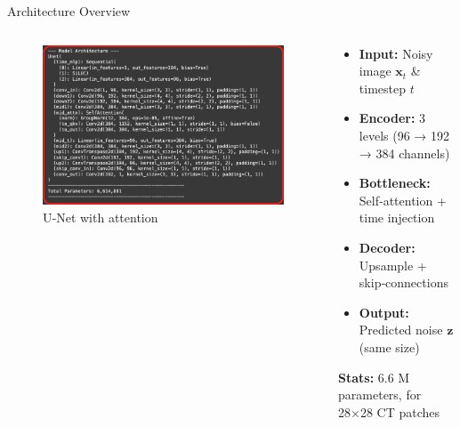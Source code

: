 \documentclass[10pt]{beamer}
\begin{document}
\begin{frame}{Architecture Overview}
  \begin{columns}[T]
    \begin{column}{0.55\textwidth}
        \begin{figure}
            \centering
            \includegraphics[width=\linewidth]{big_model_arch.png}
            \caption{U‑Net with attention}

        \end{figure}
      \centering
    \end{column}
    \begin{column}{0.45\textwidth}

      \begin{itemize}\itemsep0.2em
        \item \textbf{Input:} Noisy image $\mathbf{x}_t$ \& timestep $t$
        \item \textbf{Encoder:} 3 levels (96 → 192 → 384 channels)
        \item \textbf{Bottleneck:} Self‑attention + time injection
        \item \textbf{Decoder:} Upsample + skip‑connections
        \item \textbf{Output:} Predicted noise $\mathbf{z}$ (same size)
      \end{itemize}
      \vspace{0.5em}
      \textbf{Stats:} 6.6 M parameters, for 28×28 CT patches
    \end{column}
  \end{columns}
\end{frame}
\end{document}
